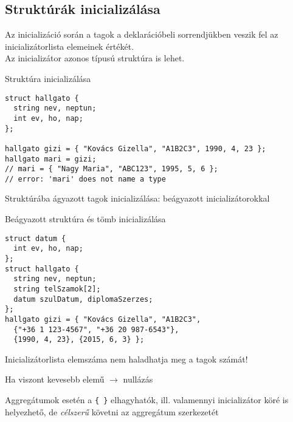 \documentclass[usenames,dvipsnames,aspectratio=169]{beamer}
\begin{document}
\subsection{Struktúrák inicializálása}
\begin{frame}[fragile]
  Az inicializáció során a tagok a deklarációbeli sorrendjükben veszik fel az inicializátorlista elemeinek értékét.\\
  Az inicializátor azonos típusú struktúra is lehet.
  \begin{exampleblock}{Struktúra inicializálása}
    \vspace{-.2cm}
    \begin{verbatim}
struct hallgato {
  string nev, neptun;
  int ev, ho, nap;
}; 

hallgato gizi = { "Kovács Gizella", "A1B2C3", 1990, 4, 23 };
hallgato mari = gizi;
// mari = { "Nagy Maria", "ABC123", 1995, 5, 6 };
// error: 'mari' does not name a type
\end{verbatim}
    \vspace{-.2cm}
  \end{exampleblock}
\end{frame}

\begin{frame}[fragile]
  \small
  Struktúrába ágyazott tagok inicializálása: beágyazott inicializátorokkal
  \begin{exampleblock}{Beágyazott struktúra és tömb inicializálása}
    \vspace{-.2cm}
    \scriptsize
    \begin{verbatim}
struct datum {
  int ev, ho, nap;
};
struct hallgato {
  string nev, neptun;
  string telSzamok[2];
  datum szulDatum, diplomaSzerzes;
};
hallgato gizi = { "Kovács Gizella", "A1B2C3", 
  {"+36 1 123-4567", "+36 20 987-6543"}, 
  {1990, 4, 23}, {2015, 6, 3} };
\end{verbatim}
    \vspace{-.2cm}
  \end{exampleblock}
  \begin{compactitem}
    \item Inicializátorlista elemszáma nem haladhatja meg a tagok számát!
    \item Ha viszont kevesebb elemű $\to$ nullázás
    \item Aggregátumok esetén a \texttt{\{ \}} elhagyhatók, ill. valamennyi inicializátor köré is helyezhető, de
\emph{célszerű} követni az aggregátum szerkezetét
  \end{compactitem}
\end{frame}
\end{document}

